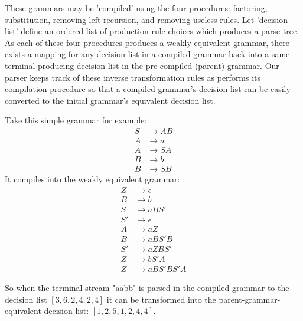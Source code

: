 \documentclass[11pt]{article}
\begin{document}
These grammars may be 'compiled' using the four procedures:
factoring, substitution, removing left recursion, and removing useless
rules. Let 'decision list' define an ordered list of production rule
choices which produces a parse tree.
As each of these four procedures produces a weakly equivalent grammar,
there exists a mapping for any decision list in a compiled grammar
back into a same-terminal-producing decision list in the pre-compiled (parent) grammar.
Our parser keeps track of these inverse transformation rules as performs
its compilation procedure so that a compiled grammar's decision list can be easily
converted to the initial grammar's equivalent decision list. 

Take this simple grammar for example:
\setcounter{equation}{0}
\begin{align}
S &\rightarrow A B\\
A &\rightarrow a\\
A &\rightarrow S A\\
B &\rightarrow b\\
B &\rightarrow S B
\end{align}
It compiles into the weakly equivalent grammar:
\setcounter{equation}{0}
\begin{align}
Z &\rightarrow \epsilon\\
B &\rightarrow b\\
S &\rightarrow a B S'\\
S' &\rightarrow \epsilon\\
A &\rightarrow a Z\\
B &\rightarrow a B S' B\\
S' &\rightarrow a Z B S'\\
Z &\rightarrow b S' A\\
Z &\rightarrow a B S' B S' A
\end{align}

So when the terminal stream "aabb" is parsed in the compiled
grammar to the decision list $[3, 6, 2, 4, 2, 4]$ it can be transformed
into the parent-grammar-equivalent decision list: $[1, 2, 5, 1, 2, 4, 4]$.
\end{document}
